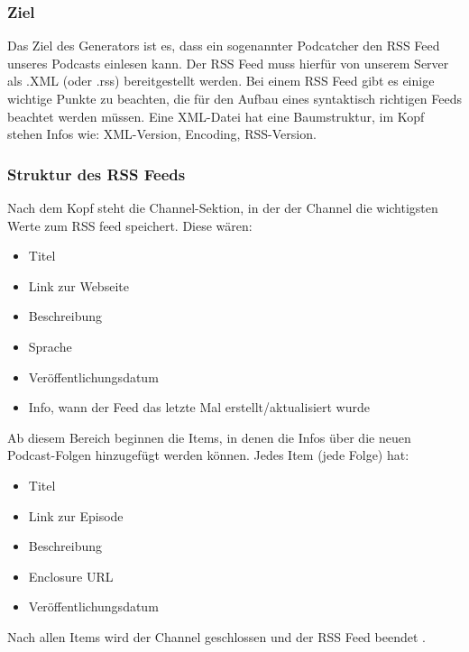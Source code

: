 \documentclass{article}
\begin{document}
\subsubsection{Ziel}
Das Ziel des Generators ist es, dass ein sogenannter Podcatcher den RSS Feed unseres Podcasts einlesen kann. Der RSS Feed muss hierfür von unserem Server als .XML (oder .rss) bereitgestellt werden. Bei einem RSS Feed gibt es einige wichtige Punkte zu beachten, die für den Aufbau eines syntaktisch richtigen Feeds beachtet werden müssen. Eine XML-Datei hat eine Baumstruktur, im Kopf stehen Infos wie: XML-Version, Encoding, RSS-Version.

\subsubsection{Struktur des RSS Feeds}
Nach dem Kopf steht die Channel-Sektion, in der der Channel die wichtigsten Werte zum RSS feed speichert. Diese wären:
\begin{itemize}
    \item Titel
    \item Link zur Webseite
    \item Beschreibung
    \item Sprache
    \item Veröffentlichungsdatum
    \item Info, wann der Feed das letzte Mal erstellt/aktualisiert wurde
\end{itemize}

Ab diesem Bereich beginnen die Items, in denen die Infos über die neuen Podcast-Folgen hinzugefügt werden können. Jedes Item (jede Folge) hat:

\begin{itemize}
    \item Titel
    \item Link zur Episode
    \item Beschreibung
    \item Enclosure URL
    \item Veröffentlichungsdatum
\end{itemize}

Nach allen Items wird der Channel geschlossen und der RSS Feed beendet \cite{rss}.
\end{document}
